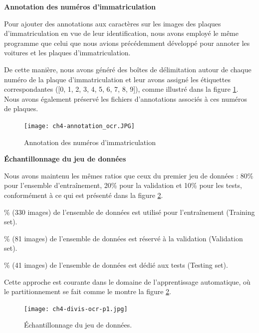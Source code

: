  
\textbf{Annotation des numéros d'immatriculation }

\par Pour ajouter des annotations aux caractères sur les images des plaques d'immatriculation en vue de leur identification, nous avons employé le même programme que celui que nous avions précédemment développé pour annoter les voitures et les plaques d'immatriculation.

De cette manière, nous avons généré des boîtes de délimitation autour de chaque numéro de la plaque d'immatriculation et leur avons assigné les étiquettes correspondantes ([0, 1, 2, 3, 4, 5, 6, 7, 8, 9]), comme illustré dans la figure \ref{fig:ch4-annotation_ocr}. Nous avons également préservé les fichiers d'annotations associés à ces numéros de plaques.

\begin{figure}[H]
	\centering
	\texttt{[image: ch4-annotation\_ocr.JPG]}
	\caption{Annotation des numéros d'immatriculation}
    \label{fig:ch4-annotation_ocr}
\end{figure}


 
\textbf{Échantillonnage du jeu de données}
\par Nous avons maintenu les mêmes ratios que ceux du premier jeu de données : 80\% pour l'ensemble d'entraînement, 20\% pour la validation et 10\% pour les tests, conformément à ce qui est présenté dans la figure \ref{fig:ch4-divis-ocr-p1}.

\begin{outline}

\% (330 images) de l'ensemble de données est utilisé pour l'entraînement (Training set).

\% (81 images) de l'ensemble de données est réservé à la validation (Validation set).

\% (41 images) de l'ensemble de données est dédié aux tests (Testing set).

\end{outline}

Cette approche est courante dans le domaine de l'apprentissage automatique, où le partitionnement se fait comme le montre la figure \ref{fig:ch4-divis-ocr-p1}.

\begin{figure}[H]
	\centering
	\texttt{[image: ch4-divis-ocr-p1.jpg]}
	\caption{Échantillonnage du jeu de données.}
\label{fig:ch4-divis-ocr-p1}
\end{figure}

